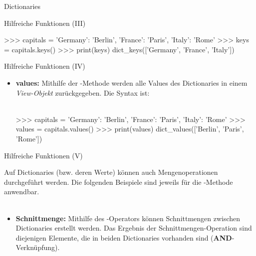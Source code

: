\begin{subsection}{Dictionaries}
\begin{frame}[fragile]{Hilfreiche Funktionen (III)}
\begin{itemize}
  
\begin{pyconcode}
>>> capitals = {'Germany': 'Berlin', 'France': 'Paris', 'Italy': 'Rome'}
>>> keys = capitals.keys()
>>> print(keys)
dict_keys(['Germany', 'France', 'Italy'])
\end{pyconcode}                
                
            \end{itemize}
                
        \end{frame}
        
        \begin{frame}[fragile]{Hilfreiche Funktionen (IV)}
        
            \begin{itemize}
                \item \textbf{values:} Mithilfe der -Methode werden alle Values des Dictionaries in einem \textit{View-Objekt} zurückgegeben. Die Syntax ist: \\~\
                
  
\begin{pyconcode}
>>> capitals = {'Germany': 'Berlin', 'France': 'Paris', 'Italy': 'Rome'}
>>> values = capitals.values()
>>> print(values)
dict_values(['Berlin', 'Paris', 'Rome'])
\end{pyconcode}                
                
            \end{itemize}
                
        \end{frame}
        
        \begin{frame}[fragile]{Hilfreiche Funktionen (V)}
        
             Auf Dictionaries (bzw. deren Werte) können auch Mengenoperationen durchgeführt werden. Die folgenden Beispiele sind jeweils für die -Methode anwendbar. \\~\
            
            \begin{itemize}
                \item \textbf{Schnittmenge:} Mithilfe des \code{\&}-Operators können Schnittmengen zwischen Dictionaries erstellt werden. Das Ergebnis der Schnittmengen-Operation sind diejenigen Elemente, die in beiden Dictionaries vorhanden sind (\textbf{AND}-Verknüpfung).
  


\end{itemize}
\end{frame}
\end{subsection}
